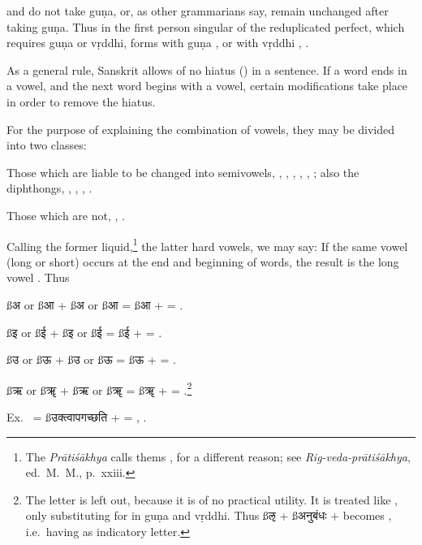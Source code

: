 \s {} and  do not take guṇa, or, as other grammarians
say, remain unchanged after taking guṇa. Thus in the first person
singular of the reduplicated perfect, which requires guṇa or vṛddhi,
 forms with guṇa , or with vṛddhi
, .

\subject[vowelsandhi]{Combination of Vowels at the end and beginning of words.}

\s As a general rule, Sanskrit allows of no hiatus () in a
sentence. If a word ends in a vowel, and the next word begins with a
vowel, certain modifications take place in order to remove the hiatus.

\s For the purpose of explaining the combination of vowels, they may be
divided into two classes:

\startitemize[n]
\item Those which are liable to be changed into semivowels, ,
  , , , , ; also
  the diphthongs, , , , .

\item Those which are not, , .
\stopitemize

Calling the former liquid,\footnote{The {\em Prātiśākhya} calls thems
  , for a different reason; see {\em Rig-veda-prātiśākhya},
  ed.\ M.\ M., p.\ xxiii.} the latter hard vowels, we may say: If the
same vowel (long or short) occurs at the end and beginning of words, the
result is the long vowel . Thus

\startnarrower
{\ss अ} or {\ss आ} + {\ss अ} or {\ss आ} = {\ss आ}  +
 = .

{\ss इ} or {\ss ई} + {\ss इ} or {\ss ई} = {\ss ई}  +
 = .

{\ss उ} or {\ss ऊ} + {\ss उ} or {\ss ऊ} = {\ss ऊ}  +
 = .

{\ss ऋ} or {\ss ॠ} + {\ss ऋ} or {\ss ॠ} = {\ss ॠ}  +
 = .\footnote{The letter  is left
  out, because it is of no practical utility. It is treated like
  , only substituting  for  in guṇa and
  vṛddhi. Thus {\ss ऌ} + {\ss अनुबंधः}  +  becomes
  , i.e.\ having  as indicatory
  letter.}
\stopnarrower

\starttabulate
\NC Ex.\  = {\ss उक्त्वापगच्छति}  +
 = , . \NC\NR

